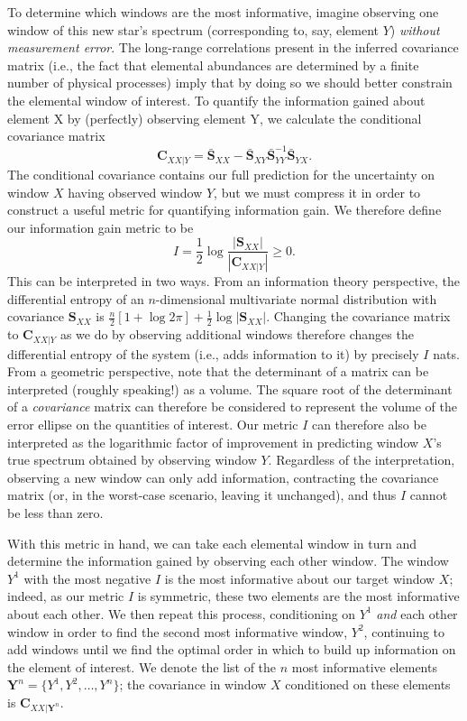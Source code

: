 \documentclass[a4paper,fleqn,usenatbib]{mnras}
\newcommand{\speccov}{{\bm S}}
\newcommand{\condcov}{{\bm C}}
\begin{document}
To determine which windows are the most informative, imagine observing one window of this new star's spectrum (corresponding to, say, element $Y$) {\it without measurement error}. The long-range correlations present in the inferred covariance matrix (i.e., the fact that elemental abundances are determined by a finite number of physical processes) imply that by doing so we should better constrain the elemental window of interest. To quantify the information gained about element X by (perfectly) observing element Y, we calculate the conditional covariance matrix
\begin{equation}
\condcov_{XX|Y} = \bar{\speccov}_{XX} - \bar{\speccov}_{XY} \bar{\speccov}_{YY}^{-1} \bar{\speccov}_{YX}.
\end{equation}
The conditional covariance contains our full prediction for the uncertainty on window $X$ having observed window $Y$, but we must compress it in order to construct a useful metric for quantifying information gain. We therefore define our information gain metric to be
\begin{equation}
I = \frac{1}{2} \log \frac{ \left| \speccov_{XX} \right| }{ \left| \condcov_{XX|Y} \right| } \ge 0.
\end{equation}
This can be interpreted in two ways. From an information theory perspective, the differential entropy of an $n$-dimensional multivariate normal distribution with covariance $\speccov_{XX}$ is $\frac{n}{2} \left[1 + \log 2\pi \right] + \frac{1}{2} \log |\speccov_{XX}|$. Changing the covariance matrix to $\condcov_{XX|Y}$ as we do by observing additional windows therefore changes the differential entropy of the system (i.e., adds information to it) by precisely $I$ nats. From a geometric perspective, note that the determinant of a matrix can be interpreted (roughly speaking!) as a volume. The square root of the determinant of a {\it covariance} matrix can therefore be considered to represent the volume of the error ellipse on the quantities of interest. Our metric $I$ can therefore also be interpreted as the logarithmic factor of improvement in predicting
window $X$'s true spectrum obtained by observing window $Y$. Regardless of the interpretation, observing a new window can only add information, contracting the covariance matrix (or, in the worst-case scenario, leaving it unchanged), and thus $I$ cannot be less than zero.

With this metric in hand, we can take each elemental window in turn and determine the information gained by observing each other window. The window $Y^1$ with the most negative $I$ is the most informative about our target window $X$; indeed, as our metric $I$ is symmetric, these two elements are the most informative about each other. We then repeat this process, conditioning on $Y^1$ {\it and} each other window in order to find the second most informative window, $Y^2$, continuing to add windows until we find the optimal order in which to build up information on the element of interest. We denote the list of the $n$ most informative elements $\bm{Y}^n = \{ Y^1, Y^2, \ldots, Y^n \}$; the covariance in window $X$ conditioned on these elements is $\condcov_{XX|\bm{Y}^n}$.
\end{document}
